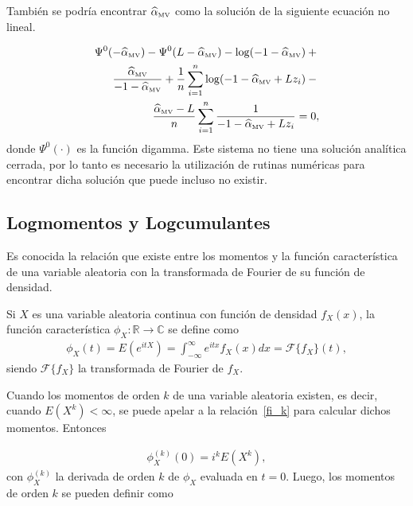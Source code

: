 También se podría encontrar $\widehat{\alpha}_{{\text{\tiny{MV}}}}$ como la solución de la siguiente ecuación no lineal.

\begin{align}
\label{rootML}
\Psi^0(-\widehat{\alpha}_{{\text{\tiny{MV}}}})-\Psi^0(L-\widehat{\alpha}_{{\text{\tiny{MV}}}})-\log(-1-\widehat{\alpha}_{{\text{\tiny{MV}}}})+{} \nonumber\\
\frac{\widehat{\alpha}_{{\text{\tiny{MV}}}}}{-1-\widehat{\alpha}_{{\text{\tiny{MV}}}}}+
\frac{1}{n}\sum_{i=1}^n{\log(-1-\widehat{\alpha}_{{\text{\tiny{MV}}}}+Lz_i)}-{}
\nonumber
\\ \frac{\widehat{\alpha}_{{\text{\tiny{MV}}}}-L}{n}\sum_{i=1}^n \frac1{-1-\widehat{\alpha}_{{\text{\tiny{MV}}}}+Lz_i}= 0, 
\end{align}
donde $\Psi^0(\cdot)$ es la función digamma. Este sistema no tiene una solución analítica cerrada, por lo tanto es necesario la utilización de rutinas numéricas para encontrar dicha solución que puede incluso no existir.

\subsection{Logmomentos y Logcumulantes}
\label{MetodoLC}

Es conocida la relación que existe entre los momentos y la función característica de una variable aleatoria con la transformada de Fourier de su función de densidad. 

\begin{definition}
Si $X$ es una variable aleatoria continua con función de densidad $f_X(x)$, la función característica $\phi_X: \mathbb{R} \rightarrow \mathbb{C}$ se define como 
\begin{align}
\phi_X(t)=E(e^{itX})=\int_{-\infty}^{\infty} e^{itx} f_X(x) dx = \mathcal{F}\{f_X\}(t),
\label{fi_caracteristica}
\end{align}
siendo $\mathcal{F}\{f_X\}$ la transformada de Fourier de $f_X$.
\end{definition}

Cuando los momentos de orden $k$ de una variable aleatoria existen, es decir, cuando $E(X^k)< \infty$, se puede apelar a la relación~\eqref{fi_k} para calcular dichos momentos. Entonces

\begin{align}
\phi_X^{(k)}(0)=i^k E(X^k),
\label{fi_k}
\end{align}
con $\phi_X^{(k)}$ la derivada de orden $k$ de $\phi_X$ evaluada en $t=0$. Luego, los momentos de orden $k$ se pueden definir como 

